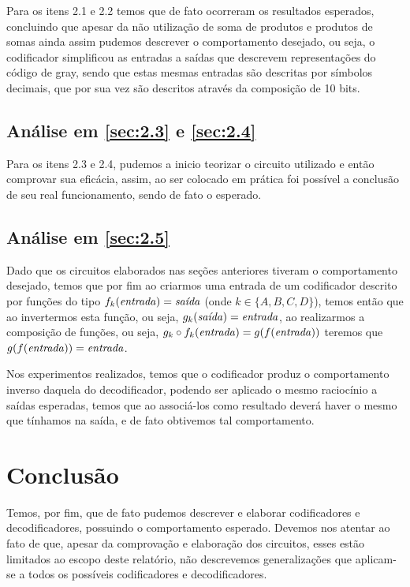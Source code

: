 \documentclass[12pt]{article}
\begin{document}
Para os itens 2.1 e 2.2 temos que de fato ocorreram os resultados esperados,
concluindo que apesar da não utilização de soma de produtos e produtos de somas
ainda assim pudemos descrever o comportamento desejado, ou seja, o codificador
simplificou as entradas a saídas que descrevem representações do código de gray,
sendo que estas mesmas entradas são descritas por símbolos decimais, que por sua
vez são descritos através da composição de 10 bits.

\subsection{Análise em \ref{sec:2.3} e \ref{sec:2.4}}\label{sec:analise2.4}

Para os itens 2.3 e 2.4, pudemos a inicio teorizar o circuito utilizado e então
comprovar sua eficácia, assim, ao ser colocado em prática foi possível a
conclusão de seu real funcionamento, sendo de fato o esperado.

\subsection{Análise em \ref{sec:2.5}}\label{sec:analise2.5}

Dado que os circuitos elaborados nas seções anteriores tiveram o comportamento
desejado, temos que por fim ao criarmos uma entrada de um codificador descrito
por funções do tipo $f_{k}(\text{\emph{entrada}}) = \text{\emph{saída}}$ (onde
$k \in \{A,B,C,D\}$), temos então que ao invertermos esta função, ou seja,
$g_{k}(\text{\emph{saída}}) = \text{\emph{entrada}}$, ao realizarmos a
composição de funções, ou seja,
$g_{k} \circ f_{k}(\text{\emph{entrada}}) = g(f(\text{\emph{entrada}}))$ teremos
que $g(f(\text{\emph{entrada}})) = \text{\emph{entrada}}$.

Nos experimentos realizados, temos que o codificador produz o comportamento
inverso daquela do decodificador, podendo ser aplicado o mesmo raciocínio a
saídas esperadas, temos que ao associá-los como resultado deverá haver o mesmo
que tínhamos na saída, e de fato obtivemos tal comportamento.

\section{Conclusão}
\label{sec:Conclusao}

Temos, por fim, que de fato pudemos descrever e elaborar codificadores e
decodificadores, possuindo o comportamento esperado. Devemos nos atentar ao fato
de que, apesar da comprovação e elaboração dos circuitos, esses estão limitados
ao escopo deste relatório, não descrevemos generalizações que aplicam-se a todos
os possíveis codificadores e decodificadores.
\end{document}
